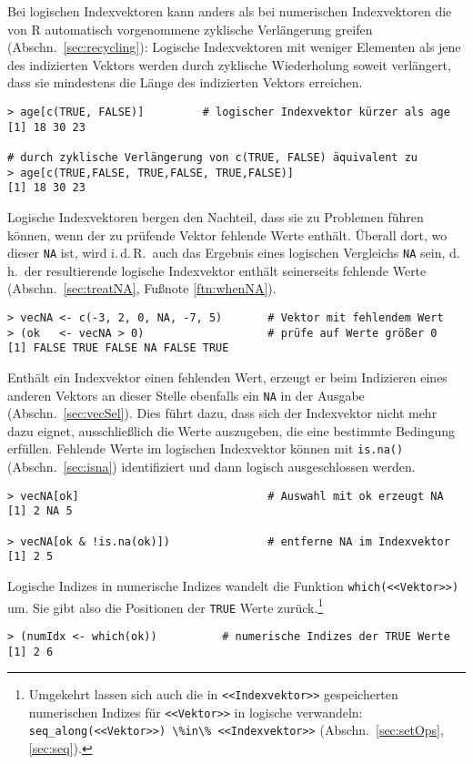 Bei logischen Indexvektoren kann anders als bei numerischen Indexvektoren die von R automatisch vorgenommene zyklische Verlängerung greifen (Abschn.\ \ref{sec:recycling}): Logische Indexvektoren mit weniger Elementen als jene des indizierten Vektors werden durch zyklische Wiederholung soweit verlängert, dass sie mindestens die Länge des indizierten Vektors erreichen.
\begin{lstlisting}
> age[c(TRUE, FALSE)]         # logischer Indexvektor kürzer als age
[1] 18 30 23

# durch zyklische Verlängerung von c(TRUE, FALSE) äquivalent zu
> age[c(TRUE,FALSE, TRUE,FALSE, TRUE,FALSE)]
[1] 18 30 23
\end{lstlisting}

Logische Indexvektoren bergen den Nachteil, dass sie zu Problemen führen können, wenn der zu prüfende Vektor fehlende Werte enthält. Überall dort, wo dieser \lstinline!NA! ist, wird i.\,d.\,R.\ auch das Ergebnis eines logischen Vergleichs \lstinline!NA! sein, d.\,h.\ der resultierende logische Indexvektor enthält seinerseits fehlende Werte (Abschn.\ \ref{sec:treatNA}, Fußnote \ref{ftn:whenNA}).
\begin{lstlisting}
> vecNA <- c(-3, 2, 0, NA, -7, 5)       # Vektor mit fehlendem Wert
> (ok   <- vecNA > 0)                   # prüfe auf Werte größer 0
[1] FALSE TRUE FALSE NA FALSE TRUE
\end{lstlisting}

Enthält ein Indexvektor einen fehlenden Wert, erzeugt er beim Indizieren eines anderen Vektors an dieser Stelle ebenfalls ein \lstinline!NA! in der Ausgabe (Abschn.\ \ref{sec:vecSel}). Dies führt dazu, dass sich der Indexvektor nicht mehr dazu eignet, ausschließlich die Werte auszugeben, die eine bestimmte Bedingung erfüllen. Fehlende Werte im logischen Indexvektor können mit \lstinline!is.na()! (Abschn.\ \ref{sec:isna}) identifiziert und dann logisch ausgeschlossen werden.
\begin{lstlisting}
> vecNA[ok]                             # Auswahl mit ok erzeugt NA
[1] 2 NA 5

> vecNA[ok & !is.na(ok)])               # entferne NA im Indexvektor
[1] 2 5
\end{lstlisting}

Logische Indizes in numerische Indizes wandelt die Funktion \lstinline!which(<<Vektor>>)! um. Sie gibt also die Positionen der \lstinline!TRUE! Werte zurück.\footnote{Umgekehrt lassen sich auch die in \lstinline!<<Indexvektor>>! gespeicherten numerischen Indizes für \lstinline!<<Vektor>>! in logische verwandeln: \lstinline!seq_along(<<Vektor>>) \%in\% <<Indexvektor>>! (Abschn.\ \ref{sec:setOps}, \ref{sec:seq}).}
\begin{lstlisting}
> (numIdx <- which(ok))          # numerische Indizes der TRUE Werte
[1] 2 6
\end{lstlisting}

